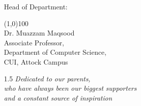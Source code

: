 \documentclass[A4paper,12pt]{report}
\theoremstyle{plain}
\theoremstyle{definition}
\theoremstyle{remark}
\numberwithin{equation}{section}
\begin{document}
\begin{flushleft}
Head of Department:\\
\vspace{0.2in}

\line(1,0){100}\\
\vspace{0.2in}
Dr. Muazzam Maqsood\\
Associate Professor,\\
Department of Computer Science,\\
CUI, Attock Campus
\end{flushleft}


\newpage
\thispagestyle{empty}
\begin{center}
\vspace*{\fill}
\begin{spacing}{1.5}
\Large\textit{Dedicated to our parents,\\
    who have always been our biggest supporters\\
    and a constant source of inspiration}
\end{spacing}
\vspace*{\fill}
\end{center}
\end{document}
